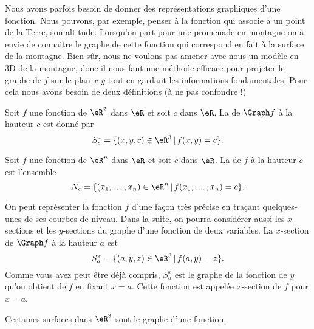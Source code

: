 Nous avons parfois besoin de donner des représentations graphiques d'une fonction. Nous pouvons, par exemple, penser à la fonction qui associe à un point de la Terre, son altitude. Lorsqu'on part pour une promenade en montagne on a envie de connaitre le graphe de cette fonction qui correspond en fait à la surface de la montagne. Bien sûr, nous ne voulons pas amener avec nous un modèle en 3D de la montagne, donc il nous faut une méthode efficace pour projeter le graphe de \( f\) sur le plan \( x\)-\( y\) tout en gardant les informations fondamentales. Pour cela nous avons besoin de deux définitions (à ne pas confondre !)
\begin{definition}
	Soit \( f\) une fonction de \( \eR^2\) dans \( \eR\) et soit \( c\) dans \( \eR\).  La  de \( \Graph f\) à la hauteur \( c\) est donné par
	\[
		S^z_c=\{ (x,y,c)\in \eR^3\,|\, f(x,y)=c\}.
	\]
\end{definition}

\begin{definition}\label{def_niveau}
	Soit \( f\) une fonction de \( \eR^n\) dans \( \eR\) et soit \( c\) dans \( \eR\). La  de \( f\) à la hauteur \( c\) est l'ensemble
	\begin{equation}
		N_c=\{ (x_1,\ldots, x_n)\in \eR^n\,|\, f(x_1,\ldots, x_n)=c\}.
	\end{equation}
\end{definition}
On peut représenter la fonction \( f\) d'une façon très précise en traçant quelques-unes de ses courbes de niveau. Dans la suite, on pourra considérer aussi les \( x\)-sections et les \( y\)-sections du graphe d'une fonction de deux variables. La \( x\)-section de \( \Graph f\) à la hauteur \( a\) est
\[
	S^x_a=\{(a,y,z)\in\eR^3\,|\, f(a,y)=z\}.
\]
Comme vous avez peut être déjà compris, \( S^x_a\) est le graphe de la fonction de \( y\) qu'on obtient de \( f\) en fixant \( x=a\). Cette fonction est appelée \( x\)-section de \( f\) pour \( x=a\).

Certaines surfaces dans \( \eR^3\) sont le graphe d'une fonction.


